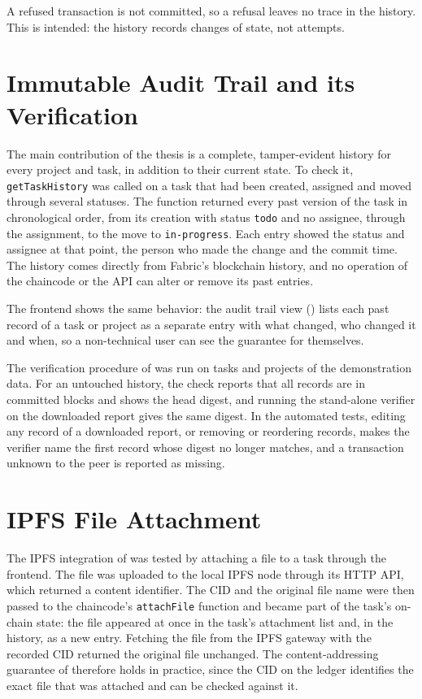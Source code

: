 A refused transaction is not committed, so a refusal leaves no trace in the history. This is intended: the history records changes of state, not attempts.

\section{Immutable Audit Trail and its Verification}
\label{sec:results-audit}

The main contribution of the thesis is a complete, tamper-evident history for every project and task, in addition to their current state. To check it, \texttt{getTaskHistory} was called on a task that had been created, assigned and moved through several statuses. The function returned every past version of the task in chronological order, from its creation with status \texttt{todo} and no assignee, through the assignment, to the move to \texttt{in-progress}. Each entry showed the status and assignee at that point, the person who made the change and the commit time. The history comes directly from Fabric's blockchain history, and no operation of the chaincode or the API can alter or remove its past entries.

The frontend shows the same behavior: the audit trail view () lists each past record of a task or project as a separate entry with what changed, who changed it and when, so a non-technical user can see the guarantee for themselves.

The verification procedure of  was run on tasks and projects of the demonstration data. For an untouched history, the check reports that all records are in committed blocks and shows the head digest, and running the stand-alone verifier on the downloaded report gives the same digest. In the automated tests, editing any record of a downloaded report, or removing or reordering records, makes the verifier name the first record whose digest no longer matches, and a transaction unknown to the peer is reported as missing.

\section{IPFS File Attachment}
\label{sec:results-ipfs}

The IPFS integration of  was tested by attaching a file to a task through the frontend. The file was uploaded to the local IPFS node through its HTTP API, which returned a content identifier. The CID and the original file name were then passed to the chaincode's \texttt{attachFile} function and became part of the task's on-chain state: the file appeared at once in the task's attachment list and, in the history, as a new entry. Fetching the file from the IPFS gateway with the recorded CID returned the original file unchanged. The content-addressing guarantee of  therefore holds in practice, since the CID on the ledger identifies the exact file that was attached and can be checked against it.

